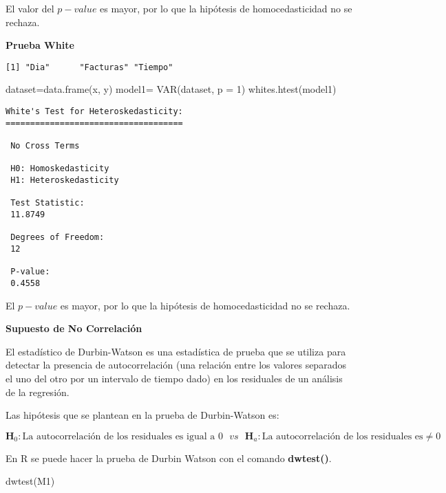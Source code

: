 \documentclass[
  a4paper,
  oneside,
  openany]{book}
\newenvironment{Shaded}{\begin{snugshade}}{\end{snugshade}}
\newcommand{\AttributeTok}[1]{\textcolor[rgb]{0.77,0.63,0.00}{#1}}
\newcommand{\DecValTok}[1]{\textcolor[rgb]{0.00,0.00,0.81}{#1}}
\newcommand{\FunctionTok}[1]{\textcolor[rgb]{0.00,0.00,0.00}{#1}}
\newcommand{\NormalTok}[1]{#1}
\newcommand{\OtherTok}[1]{\textcolor[rgb]{0.56,0.35,0.01}{#1}}
\begin{document}
El valor del \(p-value\) es mayor, por lo que la hipótesis de homocedasticidad no se rechaza.

\textbf{Prueba White}

\begin{verbatim}
[1] "Dia"      "Facturas" "Tiempo"  
\end{verbatim}

\begin{Shaded}
\begin{Highlighting}[]
\NormalTok{dataset}\OtherTok{=}\FunctionTok{data.frame}\NormalTok{(x, y)}
\NormalTok{model1}\OtherTok{=} \FunctionTok{VAR}\NormalTok{(dataset, }\AttributeTok{p =} \DecValTok{1}\NormalTok{)}
\FunctionTok{whites.htest}\NormalTok{(model1)}
\end{Highlighting}
\end{Shaded}

\begin{verbatim}
White's Test for Heteroskedasticity:
==================================== 

 No Cross Terms

 H0: Homoskedasticity
 H1: Heteroskedasticity

 Test Statistic:
 11.8749 

 Degrees of Freedom:
 12 

 P-value:
 0.4558 
\end{verbatim}

El \(p-value\) es mayor, por lo que la hipótesis de homocedasticidad no se rechaza.

\textbf{Supuesto de No Correlación}

El estadístico de Durbin-Watson es una estadística de prueba que se utiliza para detectar la presencia de autocorrelación (una relación entre los valores separados el uno del otro por un intervalo de tiempo dado) en los residuales de un análisis de la regresión.

Las hipótesis que se plantean en la prueba de Durbin-Watson es:

\[\textbf{H}_0: \mbox{La autocorrelación de los residuales es igual a } 0 \ \ \  vs \ \ \  \textbf{H}_a: \mbox{La autocorrelación de los residuales es} \neq 0\]

En R se puede hacer la prueba de Durbin Watson con el comando \textbf{dwtest()}.

\begin{Shaded}
\begin{Highlighting}[]
\FunctionTok{dwtest}\NormalTok{(M1)}
\end{Highlighting}
\end{Shaded}
\end{document}
